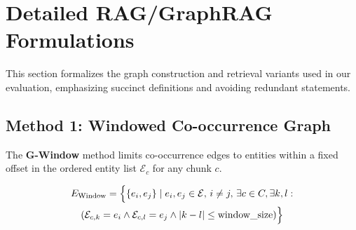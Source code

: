\documentclass{article}
\theoremstyle{plain}
\theoremstyle{definition}
\theoremstyle{remark}
\begin{document}








\newpage
\appendix









\section{Detailed RAG/GraphRAG Formulations}
\label{appendix:grag formulations}
This section formalizes the graph construction and retrieval variants used in our evaluation, emphasizing succinct definitions and avoiding redundant statements.

\subsection{Method 1: Windowed Co-occurrence Graph}
The \textbf{G-Window} method limits co-occurrence edges to entities within a fixed offset in the ordered entity list $\mathcal{E}_c$ for any chunk $c$.
\begin{small}
\begin{multline}
E_{\text{Window}} = \Bigl\{ \{e_i, e_j\} \mid e_i, e_j \in \mathcal{E}, \, i \neq j, \, 
\exists c \in C, \exists k, l : \\ 
(\mathcal{E}_{c,k} = e_i \land \mathcal{E}_{c,l} = e_j \land |k - l| \le \text{window\_size}) \Bigr\}
\end{multline}
\end{small}
\end{document}
